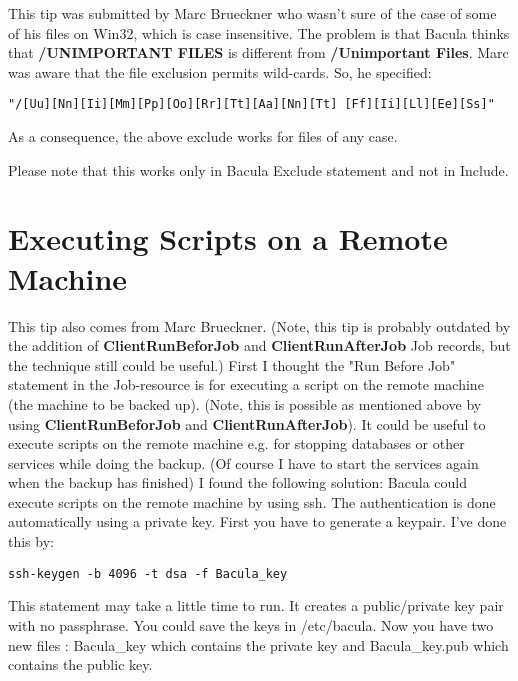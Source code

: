 This tip was submitted by Marc Brueckner who wasn't sure of the case of some
of his files on Win32, which is case insensitive. The problem is that Bacula
thinks that {\bf /UNIMPORTANT FILES} is different from {\bf /Unimportant
Files}. Marc was aware that the file exclusion permits wild-cards. So, he
specified:

\footnotesize
\begin{verbatim}
"/[Uu][Nn][Ii][Mm][Pp][Oo][Rr][Tt][Aa][Nn][Tt] [Ff][Ii][Ll][Ee][Ss]"
\end{verbatim}
\normalsize

As a consequence, the above exclude works for files of any case.

Please note that this works only in Bacula Exclude statement and not in
Include.

\section{Executing Scripts on a Remote Machine}
\label{RemoteExecution}

This tip also comes from Marc Brueckner. (Note, this tip is probably outdated
by the addition of {\bf ClientRunBeforJob} and {\bf ClientRunAfterJob} Job
records, but the technique still could be useful.) First I thought the "Run
Before Job" statement in the Job-resource is for executing a script on the
remote machine (the machine to be backed up). (Note, this is possible as mentioned
above by using {\bf ClientRunBeforJob} and {\bf ClientRunAfterJob}).
It could be useful to execute
scripts on the remote machine e.g. for stopping databases or other services
while doing the backup. (Of course I have to start the services again when the
backup has finished) I found the following solution: Bacula could execute
scripts on the remote machine by using ssh. The authentication is done
automatically using a private key. First you have to generate a keypair. I've
done this by:

\footnotesize
\begin{verbatim}
ssh-keygen -b 4096 -t dsa -f Bacula_key
\end{verbatim}
\normalsize

This statement may take a little time to run. It creates a public/private key
pair with no passphrase. You could save the keys in /etc/bacula. Now you have
two new files : Bacula\_key which contains the private key and Bacula\_key.pub
which contains the public key.

